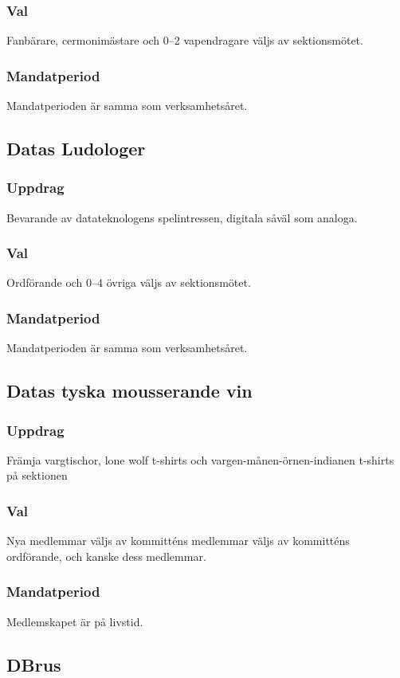 \subsubsection{Val}
Fanbärare, cermonimästare och 0--2 vapendragare väljs av sektionsmötet.
\subsubsection{Mandatperiod}
Mandatperioden är samma som verksamhetsåret. 

\subsection{Datas Ludologer}
\subsubsection{Uppdrag}
Bevarande av datateknologens spelintressen, digitala såväl som analoga.
\subsubsection{Val}
Ordförande och 0--4 övriga väljs av sektionsmötet.
\subsubsection{Mandatperiod}
Mandatperioden är samma som verksamhetsåret. 

\subsection{Datas tyska mousserande vin}
\subsubsection{Uppdrag}
Främja vargtischor, lone wolf t-shirts och vargen-månen-örnen-indianen t-shirts på sektionen 
\subsubsection{Val}
Nya medlemmar väljs av kommitténs medlemmar väljs av kommitténs ordförande, och kanske dess medlemmar.
\subsubsection{Mandatperiod}
Medlemskapet är på livstid.

\subsection{DBrus}
